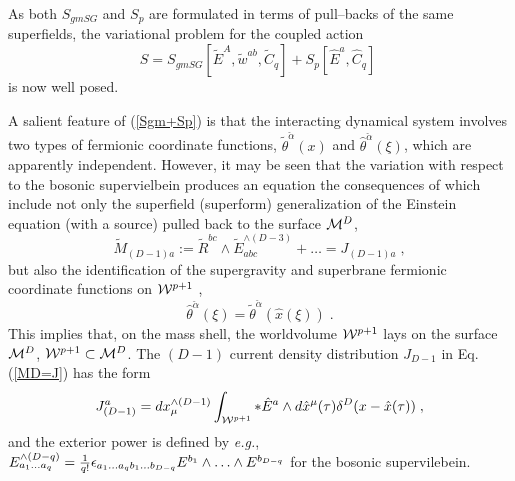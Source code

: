 \documentclass[a4paper,11pt]{article}
\begin{document}
As both $S_{gmSG}$ and $S_p$ are formulated in terms of pull--backs of the 
same superfields, the variational problem for the coupled action 
\begin{equation}
  \label{Sgm+Sp} 
S = S_{gmSG}[\tilde{E}^A,\tilde{w}^{ab}, \tilde{C}_q] 
+ S_{p}[\hat{E}^a, \hat{C}_q] 
\;  
\end{equation} 
is now well posed. 

A salient feature of (\ref{Sgm+Sp}) is that the interacting 
dynamical system involves two types of fermionic coordinate functions, 
$\tilde{\theta}^{\check{\alpha}} (x)$ and 
$\hat{\theta}^{\check{\alpha}} (\xi)$, which are apparently 
independent. However, it may be seen \cite{BAIL} that 
the variation with respect to the bosonic supervielbein produces 
an equation the consequences of which include not 
only the superfield (superform) generalization of the Einstein equation  
(with a source)   
pulled back to the surface ${\cal M}^D$, 
\begin{equation}
  \label{MD=J} 
\tilde{M}_{(D-1)a}:= \tilde{R}^{bc} \wedge \tilde{E}^{\wedge (D-3)}_{abc} 
+ \ldots = J_{(D-1)a} \; ,  
\end{equation} 
but also the identification of the supergravity and superbrane 
fermionic coordinate functions on ${\cal W}^{p+1}$ \cite{BAIL}, 
\begin{equation}
  \label{th=th} 
\hat{\theta}^{\check{\alpha}} (\xi)= 
\tilde{\theta}^{\check{\alpha}} (\hat{x}(\xi)) \; . 
\end{equation} 
This implies that, on the mass shell, the worldvolume ${\cal W}^{p+1}$ 
lays on the surface ${\cal M}^D$, ${\cal W}^{p+1}\subset {\cal M}^D$. 
The $(D-1)$ current density distribution $J_{D-1}$
in Eq. (\ref{MD=J}) has the form 
\begin{equation}\label{JD=} 
J^a_{(D-1)}  = dx^{\wedge (D-1)}_\mu \int_{{\cal W}^{p+1}} *\hat{E}^a \wedge 
d\hat{x}^\mu (\tau)  \delta^D(x - \hat{x}(\tau))\; , 
\end{equation} 
and the exterior power is defined by {\it e.g.}, 
$E^{\wedge (D-q)}_{a_1\ldots a_q}= {1\over q!} 
\epsilon_{a_1\ldots a_qb_1\ldots b_{D-q}}E^{b_1}\wedge \ldots 
\wedge E^{b_{D-q}}$ for the bosonic 
supervilebein.
\end{document}

